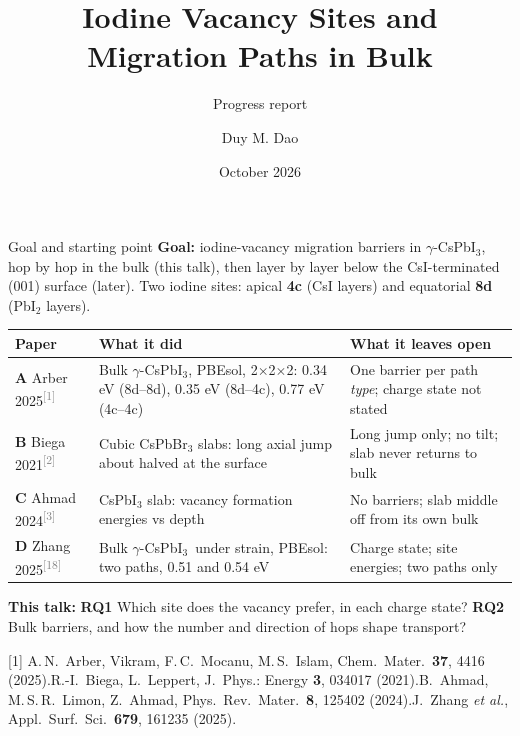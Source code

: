 \documentclass[aspectratio=169,10pt]{beamer}
\title{Iodine Vacancy Sites and Migration Paths in Bulk \cpi}
\subtitle{Progress report}
\author{Duy M. Dao}
\institute{School of Materials Science and Engineering, Tsinghua University}
\date{October 2026}
\newcommand{\cpi}{$\gamma$-CsPbI$_3$}
\newcommand{\cit}[1]{\textsuperscript{\textcolor{gray}{[#1]}}}
\newcommand{\refs}[1]{\par\vfill\begingroup\tiny\color{gray}\raggedright #1\par\endgroup}
\newcommand{\RA}{[1] A.\,N.~Arber, Vikram, F.\,C.~Mocanu, M.\,S.~Islam, Chem.\ Mater.\ \textbf{37}, 4416 (2025).}
\newcommand{\RB}{[2] R.-I.~Biega, L.~Leppert, J.\ Phys.: Energy \textbf{3}, 034017 (2021).}
\newcommand{\RC}{[3] B.~Ahmad, M.\,S.\,R.~Limon, Z.~Ahmad, Phys.\ Rev.\ Mater.\ \textbf{8}, 125402 (2024).}
\newcommand{\RT}{[18] J.~Zhang \emph{et al.}, Appl.\ Surf.\ Sci.\ \textbf{679}, 161235 (2025).}
\begin{document}
\maketitle

\begin{frame}{Goal and starting point}
  \small
  \textbf{Goal:} iodine-vacancy migration barriers in \cpi, hop by hop in the bulk \alert{(this talk)}, then layer by layer below the CsI-terminated (001) surface (later).
  Two iodine sites: apical \textbf{4c} (CsI layers) and equatorial \textbf{8d} (PbI$_2$ layers).

  \vspace{0.4em}
  \scriptsize
  \begin{tabular}{p{}p{}p{}}
    \toprule
    Paper & What it did & What it leaves open \\
    \midrule
    \textbf{A} Arber 2025\cit{1} & Bulk \cpi, PBEsol, 2$\times$2$\times$2: 0.34 eV (8d--8d), 0.35 eV (8d--4c), 0.77 eV (4c--4c) & One barrier per path \emph{type}; charge state not stated \\
    \textbf{B} Biega 2021\cit{2} & Cubic CsPbBr$_3$ slabs: long axial jump about halved at the surface & Long jump only; no tilt; slab never returns to bulk \\
    \textbf{C} Ahmad 2024\cit{3} & CsPbI$_3$ slab: vacancy formation energies vs depth & No barriers; slab middle off from its own bulk \\
    \textbf{D} Zhang 2025\cit{18} & Bulk \cpi\ under strain, PBEsol: two paths, 0.51 and 0.54 eV & Charge state; site energies; two paths only \\
    \bottomrule
  \end{tabular}

  \vspace{0.4em}
  \small
  \textbf{This talk:} \textbf{RQ1} Which site does the vacancy prefer, in each charge state? \quad
  \textbf{RQ2} Bulk barriers, and how the number and direction of hops shape transport?
  \refs{\RA\quad \RB\quad \RC\quad \RT}
\end{frame}
\end{document}
